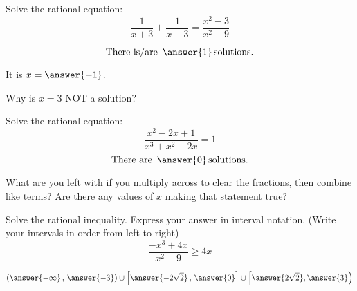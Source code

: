 \documentclass{ximera}
\author{Carl Stitz \and Jeff Zeager \and  Bobby Ramsey}
\begin{document}
\begin{exercise}
	Solve the rational equation:
	\[ \frac{1}{x+3} + \frac{1}{x-3} = \frac{x^2-3}{x^2-9} \]
	
	\[ \text{There is/are } \, \answer{1} \, \text{solutions.} \]
	\begin{exercise}
		It is $x = \answer{-1}$.
		\begin{exercise}
			Why is $x=3$ NOT a solution?
			\begin{multipleChoice}
			\end{multipleChoice}
		\end{exercise}
	\end{exercise}
\end{exercise}

\begin{exercise}
	Solve the rational equation:
	\[ \frac{x^2-2x+1}{x^3+x^2-2x} = 1 \]
	\[ \text{There are } \, \answer{0} \, \text{solutions.} \]
	\begin{feedback}
		What are you left with if you multiply across to clear the fractions, then combine like terms?  Are there any values of $x$ making that statement true?	
	\end{feedback}		
\end{exercise}

\begin{exercise}
	Solve the rational inequality.  Express your answer in interval notation.  (Write your intervals in order from left to right)
	\[ \frac{-x^3+4x}{x^2-9} \geq 4x  \]
	
	\[ \left( \answer{-\infty} \, , \, \answer{-3} \right) \cup \left[ \answer{-2\sqrt{2}} \, , \, \answer{0} \right] \cup \left[ \answer{2\sqrt{2}} , \answer{3} \right) \]
		
\end{exercise}
\end{document}
